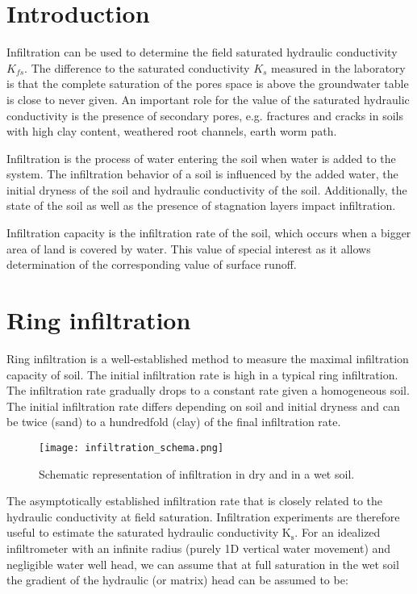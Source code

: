 \documentclass[
10pt, %
a4paper, %
oneside, %
headinclude,footinclude, %
BCOR5mm, %
]{scrartcl}
\begin{document}
\section{Introduction}

Infiltration can be used to determine the field saturated hydraulic conductivity $K_{fs}$. The difference to the saturated conductivity $K_s$ measured in the laboratory is that the complete saturation of the pores space is above the groundwater table is close to never given. An important role for the value of the saturated hydraulic conductivity is the presence of secondary pores, e.g. fractures and cracks in soils with high clay content, weathered root channels, earth worm path. \medskip

Infiltration is the process of water entering the soil when water is added to the system. The infiltration behavior of a soil is influenced by the added water, the initial dryness of the soil and hydraulic conductivity of the soil. Additionally, the state of the soil as well as the presence of stagnation layers impact infiltration. \medskip

Infiltration capacity is the infiltration rate of the soil, which occurs when a bigger area of land is covered by water. This value of special interest as it allows determination of the corresponding value of surface runoff.\medskip

\section{Ring infiltration}
Ring infiltration is a well-established method to measure the maximal infiltration capacity of soil. The initial infiltration rate is high in a typical ring infiltration. The infiltration rate gradually drops to a constant rate given a homogeneous soil. The initial infiltration rate differs depending on soil and initial dryness and can be twice (sand) to a hundredfold (clay) of the final infiltration rate.

\begin{figure}[!h]
\centering
\texttt{[image: infiltration\_schema.png]}
\caption{\label{schema_inf}Schematic representation of infiltration in dry and in a wet soil.}
\end{figure}

The asymptotically established infiltration rate that is closely related to the hydraulic conductivity at field saturation. Infiltration experiments are therefore useful to estimate the saturated hydraulic conductivity K$_\mathrm{s}$. For an idealized infiltrometer with an infinite radius (purely 1D vertical water movement) and negligible water well head, we can assume that at full saturation in the wet soil the gradient of the hydraulic (or matrix) head can be assumed to be:
\end{document}
